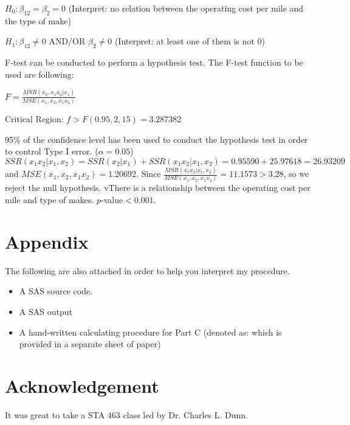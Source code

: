 \documentclass[letterpaper]{article}
\begin{document}
\begin{center}
$H_0: \beta_{12} = \beta_{2} = 0$ (Interpret: no relation between the operating cost per mile and the type of make)

$H_1: \beta_{12} \neq 0$ AND/OR $\beta_{2} \neq 0$ (Interpret: at least one of them is not 0)
\end{center}

\begin{flushleft}
F-test can be conducted to perform a hypothesis test. The F-test function to be used are following:
\end{flushleft}

\begin{center}
$F = \frac{MSR(x_2,x_1x_2|x_1)}{MSE(x_1,x_2,x_1x_2)}$

Critical Region: $f > F(0.95, 2, 15) = 3.287382$
\end{center}

\begin{flushleft}
95\% of the confidence level has been used to conduct the hypothesis test in order to control Type I error. ($\alpha = 0.05$) $SSR(x_1x_2|x_1,x_2) = SSR(x_2|x_1) + SSR(x_1x_2|x_1,x_2) = 0.95590 + 25.97618 = 26.93209$ and $MSE(x_1,x_2,x_1x_2) = 1.20692$. Since $\frac{MSR(x_1x_2|x_1,x_2)}{MSE(x_1,x_2,x_1x_2)} = 11.1573 > 3.28$, so we reject the null hypothesis. vThere is a relationship between the operating cost per mile and type of makes. $p$-value$ < 0.001$.
\end{flushleft}

\section{Appendix}
\begin{flushleft}
The following are also attached in order to help you interpret my procedure.
\end{flushleft}

\begin{itemize}
\item A SAS source code.
\item A SAS output
\item A hand-written calculating procedure for Part C (denoted as: which is provided in a separate sheet of paper)
\end{itemize}

\section{Acknowledgement}
\begin{flushleft}
It was great to take a STA 463 class led by Dr. Charles L. Dunn.
\end{flushleft}
\end{document}
